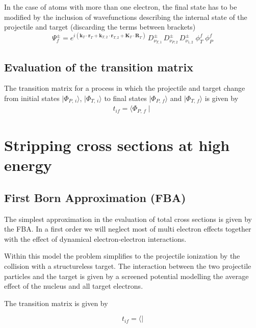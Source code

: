 In the case of atoms with more than one electron, the final state has to be
modified by the inclusion of wavefunctions describing the internal state of
the projectile and target (discarding the terms between brackets)
\[
\Psi^{\pm}_{f} = e^{i (\bm{k}_{T} \cdot \bm{r}_{T} + \bm{k}_{T,2} \cdot
\bm{r}_{T,2} + \bm{K}_{T} \cdot \bm{R}_{T})} \, D^{\pm}_{\nu_{T,1}}\,
D^{\pm}_{\nu_{P,2}}\, D^{\pm}_{\nu_{1,2}} \; \phi^{f}_{T} \; \phi^{f}_{P}
\]


\subsection{Evaluation of the transition matrix}

The transition matrix for a process in which the projectile and target change
from initial states $\mid \Phi_{P,\,i} \rangle $, $\mid \Phi_{T,\,i} \rangle
$ to final states $\mid \Phi_{P,\,f} \rangle$ and $\mid \Phi_{T,\,f} \rangle$
is given by
\begin{eqnarray}\label{Q:Sim2}
t_{if} = \langle \Phi_{P,\,f} \mid
\end{eqnarray}



\section{Stripping cross sections at high energy}

\subsection{First Born Approximation (FBA)}

The simplest approximation in the evaluation of total cross sections is given
by the FBA. In a first order we will neglect most of multi electron effects
together with the effect of dynamical electron-electron interactions.

Within this model the problem simplifies to the projectile ionization by the
collision with a structureless target. The interaction between the two
projectile particles and the target is given by a screened potential
modelling the average effect of the nucleus and all target electrons.

The transition matrix is given by

\[
t_{if} = \langle \mid
\]


